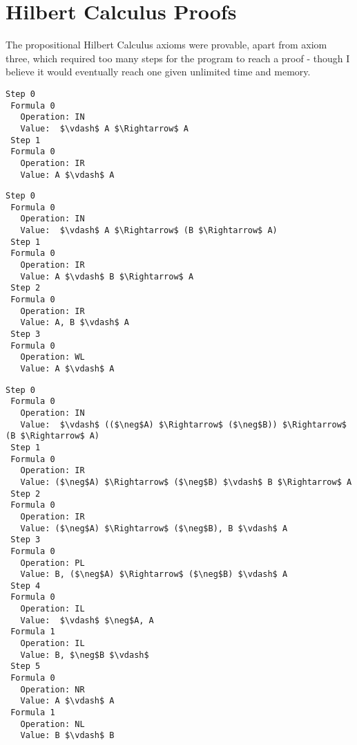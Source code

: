 \documentclass{article}
\begin{document}
\section{Hilbert Calculus Proofs}

The propositional Hilbert Calculus axioms were provable, apart from axiom three,
which required too many steps for the program to reach a proof - though I
believe it would eventually reach one given unlimited time and memory.

\begin{lstlisting}[mathescape=true,title=Axiom 1 Proof]
 Step 0
 Formula 0
   Operation: IN
   Value:  $\vdash$ A $\Rightarrow$ A
 Step 1
 Formula 0
   Operation: IR
   Value: A $\vdash$ A
\end{lstlisting}

\begin{lstlisting}[mathescape=true,title=Axiom 2 Proof]
 Step 0
 Formula 0
   Operation: IN
   Value:  $\vdash$ A $\Rightarrow$ (B $\Rightarrow$ A)
 Step 1
 Formula 0
   Operation: IR
   Value: A $\vdash$ B $\Rightarrow$ A
 Step 2
 Formula 0
   Operation: IR
   Value: A, B $\vdash$ A
 Step 3
 Formula 0
   Operation: WL
   Value: A $\vdash$ A
\end{lstlisting}

\begin{lstlisting}[mathescape=true,title=Axiom 4 Proof]
 Step 0
 Formula 0
   Operation: IN
   Value:  $\vdash$ (($\neg$A) $\Rightarrow$ ($\neg$B)) $\Rightarrow$ (B $\Rightarrow$ A)
 Step 1
 Formula 0
   Operation: IR
   Value: ($\neg$A) $\Rightarrow$ ($\neg$B) $\vdash$ B $\Rightarrow$ A
 Step 2
 Formula 0
   Operation: IR
   Value: ($\neg$A) $\Rightarrow$ ($\neg$B), B $\vdash$ A
 Step 3
 Formula 0
   Operation: PL
   Value: B, ($\neg$A) $\Rightarrow$ ($\neg$B) $\vdash$ A
 Step 4
 Formula 0
   Operation: IL
   Value:  $\vdash$ $\neg$A, A
 Formula 1
   Operation: IL
   Value: B, $\neg$B $\vdash$ 
 Step 5
 Formula 0
   Operation: NR
   Value: A $\vdash$ A
 Formula 1
   Operation: NL
   Value: B $\vdash$ B
\end{lstlisting}
\end{document}
